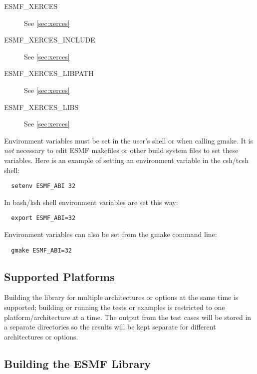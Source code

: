 \begin{description}
\item[ESMF\_XERCES]
See \ref{sec:xerces}

\item[ESMF\_XERCES\_INCLUDE]
See \ref{sec:xerces}

\item[ESMF\_XERCES\_LIBPATH]
See \ref{sec:xerces}

\item[ESMF\_XERCES\_LIBS]
See \ref{sec:xerces}

\end{description}

Environment variables must be set in the user's shell or when calling gmake. It
is {\em not} necessary to edit ESMF makefiles or other build system files to set
these variables. Here is an example of setting an environment variable in the
csh/tcsh shell:

\begin{verbatim}
  setenv ESMF_ABI 32
\end{verbatim}

In bash/ksh shell environment variables are set this way:

\begin{verbatim}
  export ESMF_ABI=32
\end{verbatim}

Environment variables can also be set from the gmake command line:

\begin{verbatim}
  gmake ESMF_ABI=32
\end{verbatim}

\subsection{Supported Platforms}


Building the library for multiple architectures or options at the same
time is supported; building or running the tests or examples is restricted
to one platform/architecture at a time.  The output from the test cases
will be stored in a separate directories so the results will be kept 
separate for different architectures or options.

\subsection{Building the ESMF Library}
\label{BuildESMF}



